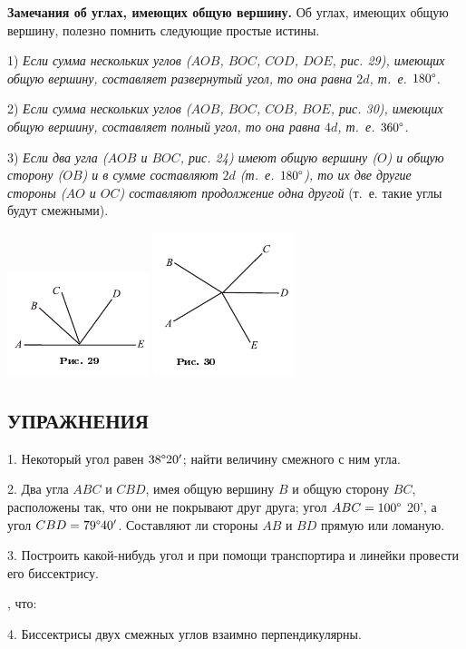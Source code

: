 \documentclass[oneside]{book}
\begin{document}
\textbf{Замечания об углах, имеющих общую вершину.}
Об углах, имеющих общую вершину, полезно помнить следующие простые истины.

1) \emph{Если сумма нескольких углов ($AOB$, $BOC$, $COD$, $DOE$, рис. 29), имеющих общую вершину, составляет развернутый угол, то она равна $2d$, т.~е. $180\degree$.}

2) \emph{Если сумма нескольких углов ($AOB$, $BOC$, $COB$, $BOE$, рис. 30), имеющих общую вершину, составляет полный угол, то она равна $4d$, т.~е. $360\degree$.}

3) \emph{Если два угла ($AOB$ и $BOC$, рис. 24) имеют общую вершину ($O$) и общую сторону ($OB$) и в сумме составляют $2d$ (т.~е.
$180\degree$), то их две другие стороны ($AO$ и $OC$) составляют продолжение одна другой} (т.~е.
такие углы будут смежными).

\includegraphics{pics/ris-29}
\includegraphics{pics/ris-30}


\subsection*{УПРАЖНЕНИЯ}

1.
Некоторый угол равен $38\degree 20'$;
найти величину смежного с ним угла.

2.
Два угла $ABC$ и $CBD$, имея общую вершину $B$ и общую сторону $BC$, расположены так, что они не покрывают друг друга;
угол $ABC = 100\degree$ 20', а угол $CBD = 79\degree 40'$.
Составляют ли стороны $AB$ и $BD$ прямую или ломаную.

3.
Построить какой-нибудь угол и при помощи транспортира и линейки провести его биссектрису.

, что:

4.
Биссектрисы двух смежных углов взаимно перпендикулярны.
\end{document}
